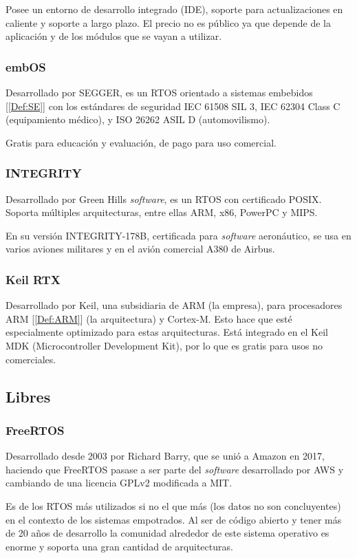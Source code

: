 Posee un entorno de desarrollo integrado (IDE), soporte para actualizaciones en caliente y soporte a largo plazo. El precio no es público ya que depende de la aplicación y de los módulos que se vayan a utilizar.

\subsubsection{embOS}
Desarrollado por SEGGER, es un RTOS orientado a sistemas embebidos [\ref{Def:SE}] con los estándares de seguridad IEC 61508 SIL 3, IEC 62304 Class C (equipamiento médico), y ISO 26262 ASIL D (automovilismo).

Gratis para educación y evaluación, de pago para uso comercial.

\subsubsection{INTEGRITY}
Desarrollado por Green Hills \emph{software}, es un RTOS con certificado POSIX. Soporta múltiples arquitecturas, entre ellas ARM, x86, PowerPC y MIPS.

En su versión INTEGRITY-178B, certificada para \emph{software} aeronáutico, se usa en varios aviones militares y en el avión comercial A380 de Airbus.


\subsubsection{Keil RTX}
Desarrollado por Keil, una subsidiaria de ARM (la empresa), para procesadores ARM [\ref{Def:ARM}] (la arquitectura) y Cortex-M. Esto hace que esté especialmente optimizado para estas arquitecturas. Está integrado en el Keil MDK (Microcontroller Development Kit), por lo que es gratis para usos no comerciales.

\subsection{Libres}
\subsubsection{FreeRTOS}
Desarrollado desde 2003 por Richard Barry, que se unió a Amazon en 2017, haciendo que FreeRTOS pasase a ser parte del \emph{software} desarrollado por AWS y cambiando de una licencia GPLv2 modificada a MIT.

Es de los RTOS más utilizados si no el que más (los datos no son concluyentes) en el contexto de los sistemas empotrados. Al ser de código abierto y tener más de 20 años de desarrollo la comunidad alrededor de este sistema operativo es enorme y soporta una gran cantidad de arquitecturas.

